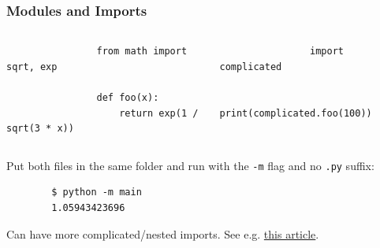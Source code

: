 \documentclass{ali-presentation}
\begin{document}
\begin{frame}[fragile,t]
    \frametitle{Modules and Imports}

    \begin{columns}[t]
        \begin{column}{.5\textwidth}
            \begin{verbatim}
                from math import sqrt, exp

                def foo(x):
                    return exp(1 / sqrt(3 * x))
            \end{verbatim}
        \end{column}
        \pause
        \begin{column}{.5\textwidth}
            \begin{verbatim}
                import complicated
                
                print(complicated.foo(100)) 
            \end{verbatim}
        \end{column}
    \end{columns}

    \bigskip
    \pause
    
    Put both files in the same folder and run with the \texttt{-m} flag and no \texttt{.py} suffix:

    \begin{verbatim}
        $ python -m main
        1.05943423696
    \end{verbatim}

    \pause

    Can have more complicated/nested imports. See e.g. \href{https://medium.com/@officialyrohanrokade/mastering-python-imports-and-module-management-a-deep-dive-into-import-keywords-folder-d92aa1daaaf5}{this article}.
\end{frame}
\end{document}
